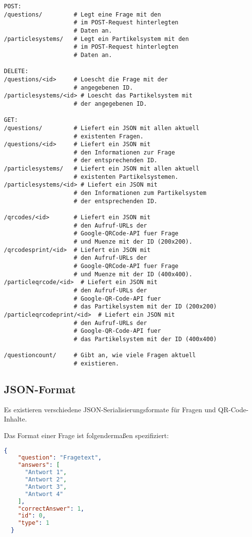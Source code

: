 \begin{lstlisting}
POST:
/questions/         # Legt eine Frage mit den
                    # im POST-Request hinterlegten
                    # Daten an.
/particlesystems/   # Legt ein Partikelsystem mit den
                    # im POST-Request hinterlegten
                    # Daten an.

DELETE:
/questions/<id>     # Loescht die Frage mit der
                    # angegebenen ID.
/particlesystems/<id> # Loescht das Partikelsystem mit
                    # der angegebenen ID.

GET:
/questions/         # Liefert ein JSON mit allen aktuell
                    # existenten Fragen.
/questions/<id>     # Liefert ein JSON mit
                    # den Informationen zur Frage
                    # der entsprechenden ID.
/particlesystems/   # Liefert ein JSON mit allen aktuell
                    # existenten Partikelsystemen.
/particlesystems/<id> # Liefert ein JSON mit
                    # den Informationen zum Partikelsystem
                    # der entsprechenden ID.

/qrcodes/<id>       # Liefert ein JSON mit
                    # den Aufruf-URLs der
                    # Google-QRCode-API fuer Frage
                    # und Muenze mit der ID (200x200).
/qrcodesprint/<id>  # Liefert ein JSON mit
                    # den Aufruf-URLs der
                    # Google-QRCode-API fuer Frage
                    # und Muenze mit der ID (400x400).
/particleqrcode/<id>  # Liefert ein JSON mit
                    # den Aufruf-URLs der
                    # Google-QR-Code-API fuer
                    # das Partikelsystem mit der ID (200x200)
/particleqrcodeprint/<id>  # Liefert ein JSON mit
                    # den Aufruf-URLs der
                    # Google-QR-Code-API fuer
                    # das Partikelsystem mit der ID (400x400)

/questioncount/     # Gibt an, wie viele Fragen aktuell
                    # existieren.
\end{lstlisting}

\subsection{JSON-Format}
\label{sub:JSON-Format}
Es existieren verschiedene JSON-Serialisierungsformate für Fragen und QR-Code-Inhalte.

Das Format einer Frage ist folgendermaßen spezifiziert:
\begin{lstlisting}[language=JSON]
  {
    "question": "Fragetext",
    "answers": [
      "Antwort 1",
      "Antwort 2",
      "Antwort 3",
      "Antwort 4"
    ],
    "correctAnswer": 1,
    "id": 0,
    "type": 1
  }
\end{lstlisting}

